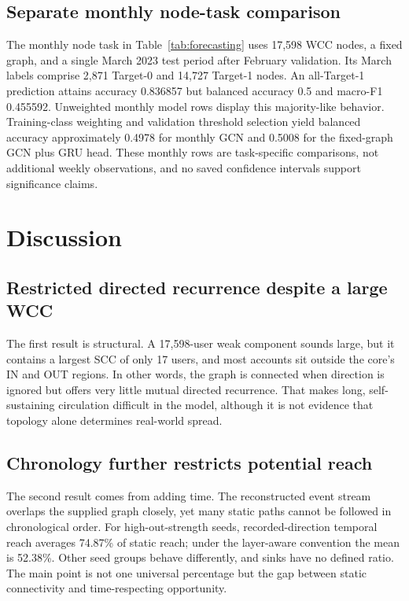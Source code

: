 \documentclass[11pt,a4paper]{article}
\begin{document}
\subsection{Separate monthly node-task comparison}
The monthly node task in Table~\ref{tab:forecasting} uses 17,598 WCC nodes, a fixed graph, and a single March 2023 test period after February validation. Its March labels comprise 2,871 Target-0 and 14,727 Target-1 nodes. An all-Target-1 prediction attains accuracy 0.836857 but balanced accuracy 0.5 and macro-F1 0.455592. Unweighted monthly model rows display this majority-like behavior. Training-class weighting and validation threshold selection yield balanced accuracy approximately 0.4978 for monthly GCN and 0.5008 for the fixed-graph GCN plus GRU head. These monthly rows are task-specific comparisons, not additional weekly observations, and no saved confidence intervals support significance claims.

\FloatBarrier

\section{Discussion}
\subsection{Restricted directed recurrence despite a large WCC}
The first result is structural. A 17,598-user weak component sounds large, but it contains a largest SCC of only 17 users, and most accounts sit outside the core's IN and OUT regions. In other words, the graph is connected when direction is ignored but offers very little mutual directed recurrence. That makes long, self-sustaining circulation difficult in the model, although it is not evidence that topology alone determines real-world spread.

\subsection{Chronology further restricts potential reach}
The second result comes from adding time. The reconstructed event stream overlaps the supplied graph closely, yet many static paths cannot be followed in chronological order. For high-out-strength seeds, recorded-direction temporal reach averages 74.87\% of static reach; under the layer-aware convention the mean is 52.38\%. Other seed groups behave differently, and sinks have no defined ratio. The main point is not one universal percentage but the gap between static connectivity and time-respecting opportunity.
\end{document}
